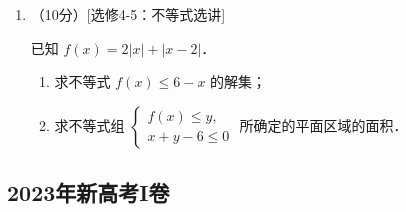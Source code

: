 \begin{description}
\begin{enumerate}[leftmargin=5pt]
        \item （10分）[选修4-5：不等式选讲]

        已知 $f(x)=2|x|+|x-2|$．

        \begin{enumerate}[label=(\arabic*)]
            \item 求不等式 $f(x)\leqslant6-x$ 的解集；
            \item 求不等式组 $\begin{cases}f(x)\leqslant y,\\x+y-6\leqslant0\end{cases}$ 所确定的平面区域的面积．
        \end{enumerate}
    \end{enumerate}
\end{description}
\clearpage


\subsection{2023年新高考I卷}\label{gk:2023年新高考I卷}

